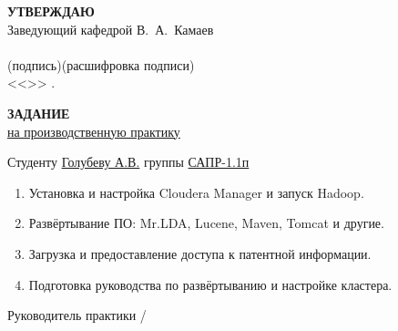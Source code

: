 \begin{titlepage}
    \begin{flushright}
        \textbf{\MakeUppercase{Утверждаю}}\hspace{4.5cm}~\\
        Заведующий кафедрой В.~А.~Камаев \\
        \underline{\hspace{3.2cm}} \underline{\hspace{4.5cm}}\\
        \vspace{-0.2cm}\footnotesize(подпись)\hspace{1.4cm}(расшифровка подписи)\hspace{0.4cm}~\normalsize\\
        <<\underline{\hspace{2cm}}>>\underline{\hspace{4cm}} \the{}.
    \end{flushright}
    \vspace{1cm}
    \begin{center}
        \textbf{\MakeUppercase{Задание}}\\
        \underline{на производственную практику}
    \end{center}
    \vspace{1cm}
    Студенту \underline{Голубеву А.В.} группы \underline{САПР-1.1п}\\
    \begin{enumerate}
        \item Установка и настройка Cloudera Manager и запуск Hadoop.
        \item Развёртывание ПО: Mr.LDA, Lucene, Maven, Tomcat и другие.
        \item Загрузка и предоставление доступа к патентной информации.
        \item Подготовка руководства по развёртыванию и настройке кластера.
    \end{enumerate}
    \vspace{\fill}
    \begin{flushright}
        Руководитель практики \underline{\hspace{5cm}} / \underline{\hspace{3cm}}
    \end{flushright}
\end{titlepage}